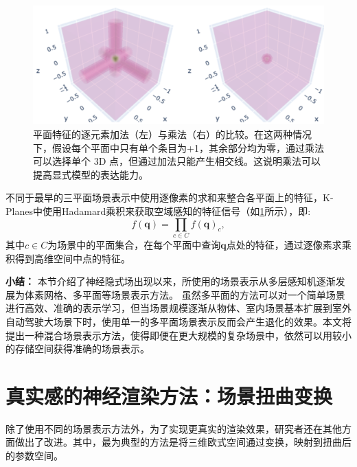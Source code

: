 \begin{figure}[ht]
    \centering
    \includegraphics[width=\textwidth]{undergraduate-thesis/images/related-work/hadamard-product.png}
    \caption{平面特征的逐元素加法（左）与乘法（右）的比较。在这两种情况下，假设每个平面中只有单个条目为+1，其余部分均为零，通过乘法可以选择单个 3D 点，但通过加法只能产生相交线。这说明乘法可以提高显式模型的表达能力\cite{fridovich-keil_k-planes_2023}。}
    \label{fig:related-work hadamard-product}
\end{figure}

不同于最早的三平面场景表示\cite{chan_efficient_2022}中使用逐像素的求和来整合各平面上的特征，K-Planes中使用Hadamard乘积来获取空域感知的特征信号（如\ref{fig:related-work hadamard-product}所示），即:
\begin{equation}
    f(\mathbf{q}) = \prod_{c\in C}f(\mathbf{q})_c,
\end{equation}
其中$c\in C$为场景中的平面集合，在每个平面中查询$\mathbf{q}$点处的特征，通过逐像素求乘积得到高维空间中点的特征。

\noindent\textbf{小结：}
本节介绍了神经隐式场出现以来，所使用的场景表示从多层感知机\cite{mildenhall_nerf_2020,park_deepsdf_2019, mescheder_occupancy_2019, shim_snerl_2023, zhi_-place_2021}逐渐发展为体素网格\cite{fridovich-keil_plenoxels_2022,yu_monosdf_2022,muller_instant_2022,jiang_instantavatar_2022}、多平面\cite{chen_tensorf_2022,fridovich-keil_k-planes_2023,cao_hexplane_2023}等场景表示方法。
虽然多平面的方法可以对一个简单场景进行高效、准确的表示学习，但当场景规模逐渐从物体、室内场景基本扩展到室外自动驾驶大场景下时，使用单一的多平面场景表示反而会产生退化的效果。本文将提出一种混合场景表示方法，使得即便在更大规模的复杂场景中，依然可以用较小的存储空间获得准确的场景表示。

\newpage
\section{真实感的神经渲染方法：场景扭曲变换}
\label{sec: related-work realistic rendering}
除了使用不同的场景表示方法外，为了实现更真实的渲染效果，研究者还在其他方面做出了改进。其中，最为典型的方法是将三维欧式空间通过变换，映射到扭曲后的参数空间。

